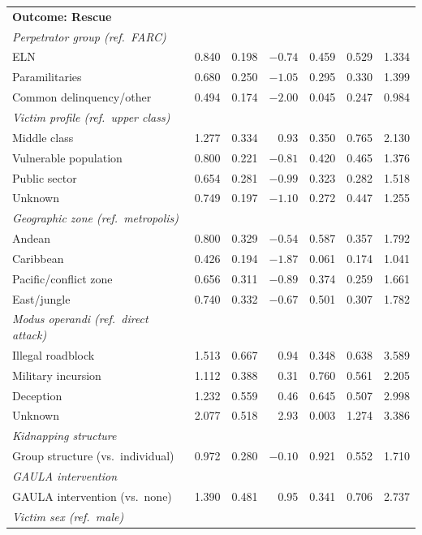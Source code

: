 {\begin{longtable}{@{}l r r r r c c@{}}
\multicolumn{7}{l}{\textbf{Outcome: Rescue}} \\
\textit{Perpetrator group (ref.\ FARC)} & & & & & & \\
ELN & 0.840 & 0.198 & $-0.74$ & 0.459 & 0.529 & 1.334 \\
Paramilitaries & 0.680 & 0.250 & $-1.05$ & 0.295 & 0.330 & 1.399 \\
Common delinquency/other & 0.494 & 0.174 & $-2.00$ & 0.045 & 0.247 & 0.984 \\
\addlinespace
\textit{Victim profile (ref.\ upper class)} & & & & & & \\
Middle class & 1.277 & 0.334 & 0.93 & 0.350 & 0.765 & 2.130 \\
Vulnerable population & 0.800 & 0.221 & $-0.81$ & 0.420 & 0.465 & 1.376 \\
Public sector & 0.654 & 0.281 & $-0.99$ & 0.323 & 0.282 & 1.518 \\
Unknown & 0.749 & 0.197 & $-1.10$ & 0.272 & 0.447 & 1.255 \\
\addlinespace
\textit{Geographic zone (ref.\ metropolis)} & & & & & & \\
Andean & 0.800 & 0.329 & $-0.54$ & 0.587 & 0.357 & 1.792 \\
Caribbean & 0.426 & 0.194 & $-1.87$ & 0.061 & 0.174 & 1.041 \\
Pacific/conflict zone & 0.656 & 0.311 & $-0.89$ & 0.374 & 0.259 & 1.661 \\
East/jungle & 0.740 & 0.332 & $-0.67$ & 0.501 & 0.307 & 1.782 \\
\addlinespace
\textit{Modus operandi (ref.\ direct attack)} & & & & & & \\
Illegal roadblock & 1.513 & 0.667 & 0.94 & 0.348 & 0.638 & 3.589 \\
Military incursion & 1.112 & 0.388 & 0.31 & 0.760 & 0.561 & 2.205 \\
Deception & 1.232 & 0.559 & 0.46 & 0.645 & 0.507 & 2.998 \\
Unknown & 2.077 & 0.518 & 2.93 & 0.003 & 1.274 & 3.386 \\
\addlinespace
\textit{Kidnapping structure} & & & & & & \\
Group structure (vs.\ individual) & 0.972 & 0.280 & $-0.10$ & 0.921 & 0.552 & 1.710 \\
\addlinespace
\textit{GAULA intervention} & & & & & & \\
GAULA intervention (vs.\ none) & 1.390 & 0.481 & 0.95 & 0.341 & 0.706 & 2.737 \\
\addlinespace
\textit{Victim sex (ref.\ male)} & & & & & & \\

\end{longtable}}
